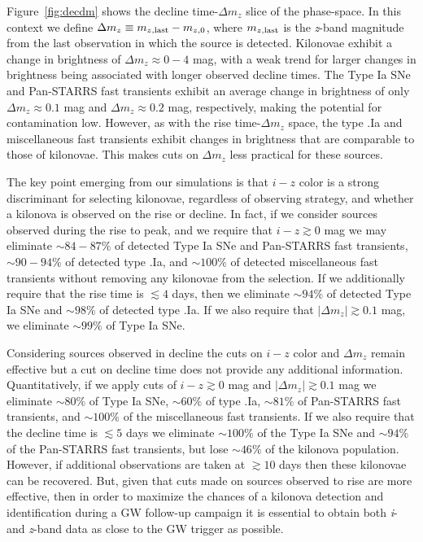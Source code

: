 Figure~\ref{fig:decdm} shows the decline time-$\Delta m_z$ slice of the phase-space. In this context we define $\Delta m_z \equiv m_{z,{\rm last}} - m_{z,{\rm 0}}$, where $m_{z,{\rm last}}$ is the {\em z}-band magnitude from the last observation in which the source is detected. Kilonovae exhibit a change in brightness of $\Delta m_z \approx 0 - 4$ mag, with a weak trend for larger changes in brightness being associated with longer observed decline times. The Type Ia SNe and Pan-STARRS fast transients exhibit an average change in brightness of only $\Delta m_z \approx 0.1$ mag and $\Delta m_z \approx 0.2$ mag, respectively, making the potential for contamination low. However, as with the rise time-$\Delta m_z$ space, the type .Ia and miscellaneous fast transients exhibit changes in brightness that are comparable to those of kilonovae. This makes cuts on $\Delta m_z$ less practical for these sources.  

The key point emerging from our simulations is that $i-z$ color is a strong discriminant for selecting kilonovae, regardless of observing strategy, and whether a kilonova is observed on the rise or decline. In fact, if we consider sources observed during the rise to peak, and we require that $i-z\gtrsim0$ mag we may eliminate $\sim84-87\%$ of detected Type Ia SNe and Pan-STARRS fast transients, $\sim90-94\%$ of detected type .Ia, and $\sim100\%$ of detected miscellaneous fast transients without removing any kilonovae from the selection. If we additionally require that the rise time is $\lesssim4$ days, then we eliminate $\sim94\%$ of detected Type Ia SNe and $\sim98\%$ of detected type .Ia. If we also require that $|\Delta m_z| \gtrsim 0.1$ mag, we eliminate $\sim99\%$ of Type Ia SNe.

Considering sources observed in decline the cuts on $i-z$ color and $\Delta m_z$ remain effective but a cut on decline time does not provide any additional information. Quantitatively, if we apply cuts of $i-z \gtrsim 0$ mag and $|\Delta m_z| \gtrsim 0.1$ mag we eliminate $\sim80\%$ of Type Ia SNe, $\sim60\%$ of type .Ia, $\sim81\%$ of Pan-STARRS fast transients, and $\sim 100\%$ of the miscellaneous fast transients. If we also require that the decline time is $\lesssim 5$ days we eliminate $\sim 100\%$ of the Type Ia SNe and $\sim94\%$ of the Pan-STARRS fast transients, but lose $\sim46\%$ of the kilonova population. However, if additional observations are taken at $\gtrsim10$ days then these kilonovae can be recovered. But, given that cuts made on sources observed to rise are more effective, then in order to maximize the chances of a kilonova detection and identification during a GW follow-up campaign it is essential to obtain both {\em i}- and {\em z}-band data as close to the GW trigger as possible. 

